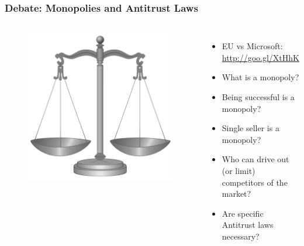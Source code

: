 \documentclass{beamer}
\begin{document}

\begin{frame}
\frametitle{Debate: Monopolies and Antitrust Laws}

\begin{columns}

\column[t]{3cm}

\begin{figure}
\vspace{-1cm}
\begin{flushleft}
	\includegraphics[scale=0.12,clip=true]{figs/scale_of_justice.png}
\end{flushleft}
\end{figure}

\pause

\column[t]{6cm}
\begin{itemize}
\item EU vs Microsoft: \small{\url{http://goo.gl/XtHhK}}
\pause
\item What is a monopoly?
\item Being successful is a monopoly?
\item Single seller is a monopoly?
\item Who can drive out (or limit) competitors of the market?
\item Are specific Antitrust laws necessary?
\end{itemize}


\end{columns}


\end{frame}
\end{document}
